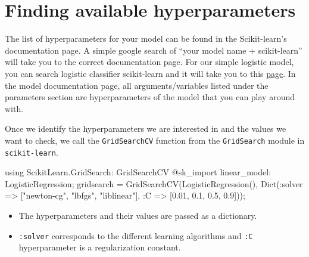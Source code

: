 \documentclass[
  letterpaper,
]{book}
\newenvironment{Shaded}{\begin{snugshade}}{\end{snugshade}}
\newcommand{\BuiltInTok}[1]{\textcolor[rgb]{0.00,0.23,0.31}{#1}}
\newcommand{\FloatTok}[1]{\textcolor[rgb]{0.68,0.00,0.00}{#1}}
\newcommand{\FunctionTok}[1]{\textcolor[rgb]{0.28,0.35,0.67}{#1}}
\newcommand{\ImportTok}[1]{\textcolor[rgb]{0.00,0.46,0.62}{#1}}
\newcommand{\NormalTok}[1]{\textcolor[rgb]{0.00,0.23,0.31}{#1}}
\newcommand{\OperatorTok}[1]{\textcolor[rgb]{0.37,0.37,0.37}{#1}}
\newcommand{\PreprocessorTok}[1]{\textcolor[rgb]{0.68,0.00,0.00}{#1}}
\newcommand{\StringTok}[1]{\textcolor[rgb]{0.13,0.47,0.30}{#1}}
\providecommand{\tightlist}{%
  \setlength{\itemsep}{0pt}\setlength{\parskip}{0pt}}\usepackage{longtable,booktabs,array}
\begin{document}
\hypertarget{finding-available-hyperparameters}{%
\section*{Finding available
hyperparameters}\label{finding-available-hyperparameters}}

The list of hyperparameters for your model can be found in the
Scikit-learn's documentation page. A simple google search of ``your
model name + scikit-learn'' will take you to the correct documentation
page. For our simple logistic model, you can search logistic classifier
scikit-learn and it will take you to this
\href{https://scikit-learn.org/stable/modules/generated/sklearn.linear_model.LogisticRegression.html}{page}.
In the model documentation page, all arguments/variables listed under
the parameters section are hyperparameters of the model that you can
play around with.

Once we identify the hyperparameters we are interested in and the values
we want to check, we call the \texttt{GridSearchCV} function from the
\texttt{GridSearch} module in \texttt{scikit-learn}.

\begin{Shaded}
\begin{Highlighting}[]
\ImportTok{using} \BuiltInTok{ScikitLearn.GridSearch}\NormalTok{: GridSearchCV}
\PreprocessorTok{@sk\_import}\NormalTok{ linear\_model}\OperatorTok{:}\NormalTok{ LogisticRegression;}
\NormalTok{gridsearch }\OperatorTok{=} \FunctionTok{GridSearchCV}\NormalTok{(}\FunctionTok{LogisticRegression}\NormalTok{(),}
            \FunctionTok{Dict}\NormalTok{(}\OperatorTok{:}\NormalTok{solver }\OperatorTok{=\textgreater{}}\NormalTok{ [}\StringTok{"newton{-}cg"}\NormalTok{, }\StringTok{"lbfgs"}\NormalTok{, }\StringTok{"liblinear"}\NormalTok{], }
            \OperatorTok{:}\NormalTok{C }\OperatorTok{=\textgreater{}}\NormalTok{ [}\FloatTok{0.01}\NormalTok{, }\FloatTok{0.1}\NormalTok{, }\FloatTok{0.5}\NormalTok{, }\FloatTok{0.9}\NormalTok{]));}
\end{Highlighting}
\end{Shaded}

\begin{itemize}
\tightlist
\item
  The hyperparameters and their values are passed as a dictionary.
\item
  \texttt{:solver} corresponds to the different learning algorithms and
  \texttt{:C} hyperparameter is a regularization constant.
\end{itemize}
\end{document}
